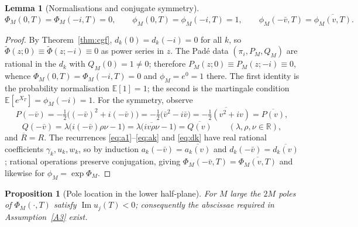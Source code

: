 \documentclass[11pt]{article}
\newtheorem{lemma}[theorem]{Lemma}
\newtheorem{proposition}[theorem]{Proposition}
\newcommand{\R}{\mathbb{R}}
\newcommand{\E}{\mathbb{E}}
\DeclareMathOperator{\Imag}{Im}
\begin{document}
\begin{lemma}[Normalisations and conjugate symmetry]\label{lem:norm}
\begin{equation}\label{eq:norm}
\Phi_M(0,T)=\Phi_M(-i,T)=0,\qquad
\phi_M(0,T)=\phi_M(-i,T)=1,\qquad
\phi_M(-\bar v,T)=\overline{\phi_M(v,T)} .
\end{equation}
\end{lemma}

\begin{proof}
By Theorem~\ref{thm:cgf}, $d_k(0)=d_k(-i)=0$ for all $k$, so
$\widetilde\Phi(z;0)\equiv\widetilde\Phi(z;-i)\equiv0$ as power series in
$z$. The Pad\'e data $(\pi_i,P_M,Q_M)$ are rational in the $d_k$ with
$Q_M(0)=1\neq0$; therefore $P_M(z;0)\equiv P_M(z;-i)\equiv0$, whence
$\Phi_M(0,T)=\Phi_M(-i,T)=0$ and $\phi_M=e^0=1$ there. The first identity is
the probability normalisation $\E[1]=1$; the second is the martingale
condition $\E[e^{X_T}]=\phi_M(-i)=1$. For the symmetry, observe
\begin{equation}\label{eq:sym-PQ}
P(-\bar v)=-\tfrac12\bigl((-\bar v)^2+i(-\bar v)\bigr)
=-\tfrac12\bigl(\bar v^2-i\bar v\bigr)=\overline{-\tfrac12(v^2+iv)}
=\overline{P(v)},
\end{equation}
\begin{equation}\label{eq:sym-Q}
Q(-\bar v)=\lambda\bigl(i(-\bar v)\rho\nu-1\bigr)
=\lambda\bigl(\overline{iv\rho\nu}-1\bigr)=\overline{Q(v)}\qquad
(\lambda,\rho,\nu\in\R),
\end{equation}
and $\overline R=R$. The recurrences \eqref{eq:a1}--\eqref{eq:ak} and
\eqref{eq:dk} have real rational coefficients $\gamma_k,u_k,w_k$, so by
induction $a_k(-\bar v)=\overline{a_k(v)}$ and
$d_k(-\bar v)=\overline{d_k(v)}$; rational operations preserve conjugation,
giving $\Phi_M(-\bar v,T)=\overline{\Phi_M(v,T)}$ and likewise for
$\phi_M=\exp\Phi_M$.
\end{proof}

\begin{proposition}[Pole location in the lower half-plane]\label{prop:strip}
For $M$ large the $2M$ poles of $\Phi_M(\cdot,T)$ satisfy $\Imag u_j(T)<0$;
consequently the abscissae required in Assumption~\ref{A3} exist.
\end{proposition}
\end{document}
